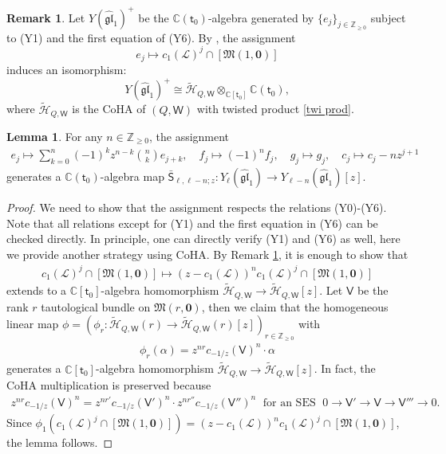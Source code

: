 \documentclass[10pt]{amsart}
\theoremstyle{definition}
\newtheorem{Lemma}[Theorem]{Lemma}
\newtheorem{Remark}[Theorem]{Remark}
\numberwithin{equation}{section}
\newcommand{\bC}{\mathbb{C}}
\newcommand{\bZ}{\mathbb{Z}}
\newcommand{\fM}{\mathfrak{M}}
\newcommand{\sS}{\mathsf{S}}
\newcommand{\sW}{\mathsf{W}}
\begin{document}
\begin{Remark}\label{rmk positive part}
Let $Y(\widehat{\mathfrak{gl}}_1)^+$ be the $\bC(\mathsf t_0)$-algebra generated by $\{e_j\}_{j\in \bZ_{\geqslant0}}$ subject to (Y1) and the first equation of (Y6). 
By \cite[Thm.~5.11]{Dav3}, the assignment 
$$e_j\mapsto c_1(\mathcal L)^{j}\cap [\fM(1,\mathbf 0)]$$ induces an isomorphism: 
$$Y(\widehat{\mathfrak{gl}}_1)^+\cong \widetilde{\mathcal {H}}_{Q,\sW}\otimes_{\bC[\mathsf t_0]}\bC(\mathsf t_0), $$ 
where $\widetilde{\mathcal {H}}_{Q,\sW}$ is the CoHA of $(Q,\sW)$ with twisted product \eqref{twi prod}.
\end{Remark}

\begin{Lemma}\label{lem shift map affine Y(gl_1)}
For any $n\in \bZ_{\geqslant 0}$, the assignment 
\begin{align*}
    e_j\mapsto \sum_{k=0}^n(-1)^kz^{n-k} \binom{n}{k}e_{j+k},\quad f_j\mapsto (-1)^n f_j,\quad g_j\mapsto g_j,\quad c_j\mapsto c_j-nz^{j+1}
\end{align*}
generates a $\bC(\mathsf t_0)$-algebra map $\bar{\sS}_{\ell,\ell-n;z}\colon Y_{\ell}(\widehat{\mathfrak{gl}}_1)\to Y_{\ell-n}(\widehat{\mathfrak{gl}}_1)[z]$.
\end{Lemma}

\begin{proof}
We need to show that the assignment respects the relations (Y0)-(Y6).
Note that all relations except for (Y1) and the first equation in (Y6) can be checked directly. In principle, one can directly verify (Y1) and (Y6) as well, here we provide another strategy using CoHA. By Remark \ref{rmk positive part}, it is enough to show that 
\begin{align*}
c_1(\mathcal L)^{j}\cap [\fM(1,\mathbf 0)]\mapsto (z-c_1(\mathcal L))^nc_1(\mathcal L)^{j}\cap [\fM(1,\mathbf 0)]
\end{align*}
extends to a $\bC[\mathsf t_0]$-algebra homomorphism $\widetilde{\mathcal {H}}_{Q,\sW}\to \widetilde{\mathcal {H}}_{Q,\sW}[z]$. Let $\mathsf V$ be the rank $r$ tautological bundle on $\fM(r,\mathbf 0)$, then we claim that the homogeneous linear map $\phi=(\phi_r\colon \widetilde{\mathcal {H}}_{Q,\sW}(r)\to \widetilde{\mathcal {H}}_{Q,\sW}(r)[z])_{r\in \bZ_{\geqslant 0}} $ with 
\begin{align*}
\phi_r(\alpha)= z^{nr}c_{-1/z}(\mathsf V)^n\cdot\alpha 
\end{align*}
generates a $\bC[\mathsf t_0]$-algebra homomorphism $\widetilde{\mathcal {H}}_{Q,\sW}\to \widetilde{\mathcal {H}}_{Q,\sW}[z]$. In fact, the CoHA multiplication is preserved because 
\begin{align*}
z^{nr}c_{-1/z}(\mathsf V)^n=z^{nr'}c_{-1/z}(\mathsf V')^n\cdot z^{nr''}c_{-1/z}(\mathsf V'')^n\;\text{ for an SES }\; 0\longrightarrow \mathsf V'\longrightarrow \mathsf V\longrightarrow\mathsf V'''\longrightarrow 0.
\end{align*}
Since $\phi_1(c_1(\mathcal L)^{j}\cap [\fM(1,\mathbf 0)])=(z-c_1(\mathcal L))^nc_1(\mathcal L)^{j}\cap [\fM(1,\mathbf 0)]$, the lemma follows.
\end{proof}
\end{document}
